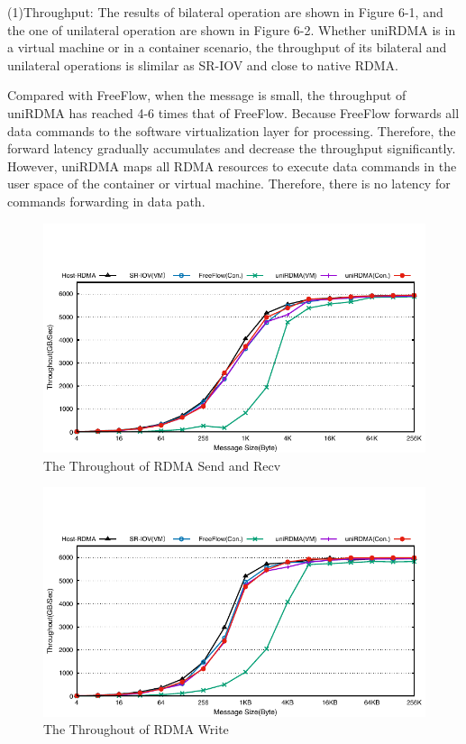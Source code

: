 (1)Throughput: The results of bilateral operation are shown in Figure 6-1, and the one of unilateral operation are shown in Figure 6-2. Whether uniRDMA is in a virtual machine or in a container scenario, the throughput of its bilateral and unilateral operations is slimilar as SR-IOV and close to native RDMA.

Compared with FreeFlow, when the message is small, the throughput of uniRDMA has reached 4-6 times that of FreeFlow. Because FreeFlow forwards all data commands to the software virtualization layer for processing. Therefore, the forward latency gradually accumulates and decrease the throughput significantly. However, uniRDMA maps all RDMA resources to execute data commands in the user space of the container or virtual machine. Therefore, there is no latency for  commands forwarding in data path.

\begin{figure}[!ht]
	\centering
	\includegraphics[width=1.0\linewidth]{images/send-bw}
	\caption{The Throughout of RDMA Send and Recv}
	\label{fig:send-bw}
\end{figure}

\begin{figure}[!ht]
	\centering
	\includegraphics[width=1.0\linewidth]{images/write-bw}
	\caption{The Throughout of RDMA Write}
	\label{fig:write-bw}
\end{figure}

